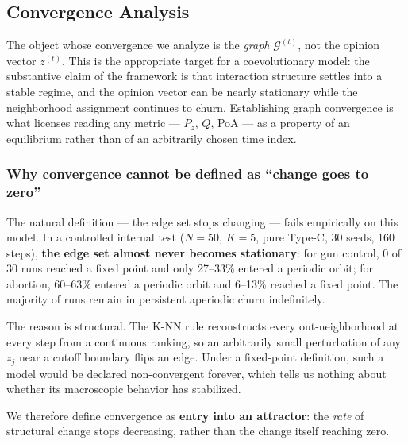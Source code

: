 \begingroup\color{revgreen}

\subsection{Convergence Analysis}
\label{sec:convergence}

The object whose convergence we analyze is the \emph{graph} $\mathcal{G}^{(t)}$, not the
opinion vector $z^{(t)}$. This is the appropriate target for a coevolutionary model: the
substantive claim of the framework is that interaction structure settles into a stable
regime, and the opinion vector can be nearly stationary while the neighborhood
assignment continues to churn. Establishing graph convergence is what licenses reading
any metric --- $P_z$, $Q$, PoA --- as a property of an equilibrium rather than of an
arbitrarily chosen time index.

\subsubsection{Why convergence cannot be defined as ``change goes to zero''}
\label{sec:conv-motivation}

The natural definition --- the edge set stops changing --- fails empirically on this
model. In a controlled internal test ($N = 50$, $K = 5$, pure Type-C, 30 seeds, 160
steps), \textbf{the edge set almost never becomes stationary}: for gun control, 0 of 30
runs reached a fixed point and only 27--33\% entered a periodic orbit; for abortion,
60--63\% entered a periodic orbit and 6--13\% reached a fixed point. The majority of runs
remain in persistent aperiodic churn indefinitely.

The reason is structural. The K-NN rule reconstructs every out-neighborhood at every
step from a continuous ranking, so an arbitrarily small perturbation of any $z_j$ near a
cutoff boundary flips an edge. Under a fixed-point definition, such a model would be
declared non-convergent forever, which tells us nothing about whether its macroscopic
behavior has stabilized.

We therefore define convergence as \textbf{entry into an attractor}: the \emph{rate} of
structural change stops decreasing, rather than the change itself reaching zero.


